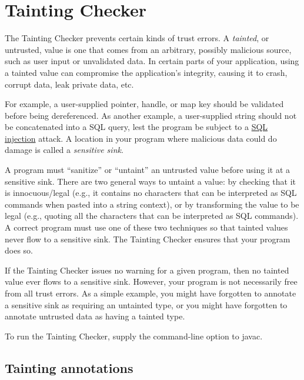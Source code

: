 \htmlhr
\chapter{Tainting Checker\label{tainting-checker}}

The Tainting Checker prevents certain kinds of trust errors.
A \emph{tainted}, or untrusted, value is one that comes from an arbitrary,
possibly malicious source, such as user input or unvalidated data.
In certain parts of your application, using a tainted value can compromise
the application's integrity, causing it to crash, corrupt data, leak
private data, etc.


For example, a user-supplied pointer, handle, or map key should be
validated before being dereferenced.
As another example, a user-supplied string should not be concatenated into a
SQL query, lest the program be subject to a
\href{https://en.wikipedia.org/wiki/Sql_injection}{SQL injection} attack.
A location in your program where malicious data could do damage is
called a \emph{sensitive sink}.

A program must ``sanitize'' or ``untaint'' an untrusted value before using
it at a sensitive sink.  There are two general ways to untaint a value:
by checking
that it is innocuous/legal (e.g., it contains no characters that can be
interpreted as SQL commands when pasted into a string context), or by
transforming the value to be legal (e.g., quoting all the characters that
can be interpreted as SQL commands).  A correct program must use one of
these two techniques so that tainted values never flow to a sensitive sink.
The Tainting Checker ensures that your program does so.

If the Tainting Checker issues no warning for a given program, then no
tainted value ever flows to a sensitive sink.  However, your program is not
necessarily free from all trust errors.  As a simple example, you might
have forgotten to annotate a sensitive sink as requiring an untainted type,
or you might have forgotten to annotate untrusted data as having a tainted
type.

To run the Tainting Checker, supply the
command-line option to javac.


\section{Tainting annotations\label{tainting-annotations}}

